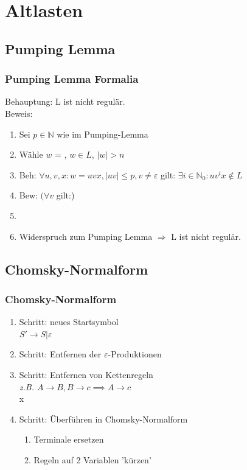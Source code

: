 


\section{Altlasten}
\subsection{Pumping Lemma}
\begin{frame}
	\frametitle{Pumping Lemma Formalia}
	Behauptung: L ist nicht regulär. ~\\
	Beweis:
	\begin{enumerate}
		\item[]Sei $p \in \mathbb{N}$ wie im Pumping-Lemma
		\item[]Wähle $w$ = \underline{\hspace{1.5 cm}}, $w \in L$, $|w| > n$
		\item[]Beh: $\forall u,v,x: w = uvx, |uv| \leq p, v \neq \varepsilon$ gilt: $\exists i \in \mathbb{N}_0: uv^ix \notin L$
		\item[] Bew: $(\forall v$ gilt:)\underline{\hspace{4.5 cm}}
		\item[] \hspace*{0.85 cm} \underline{\hspace{5.75 cm}}
		\item[] Widerspruch zum Pumping Lemma $\Rightarrow$ L ist nicht regulär.
	\end{enumerate}
\end{frame}

\subsection{Chomsky-Normalform}
\begin{frame}
	\frametitle{Chomsky-Normalform}
	\begin{enumerate}
		\item Schritt: neues Startsymbol
		\\ \emph{$S' \rightarrow S | \varepsilon$}
		\\ 
		\item Schritt: Entfernen der $\varepsilon$-Produktionen
		\\ 
		\item Schritt: Entfernen von Kettenregeln
		\\ \emph{z.B. $A \rightarrow B, B \rightarrow c \implies A \rightarrow c$}
		\\ x
		\item Schritt: Überführen in Chomsky-Normalform
		\begin{enumerate}
			\item Terminale ersetzen
			\item Regeln auf 2 Variablen 'kürzen'
		\end{enumerate}
	\end{enumerate}
\end{frame}


